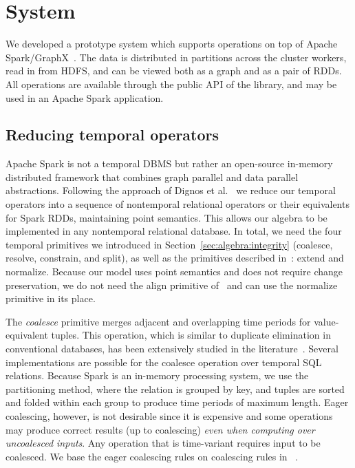 \section{System}
\label{sec:sys}

We developed a prototype system \ql which supports \tga operations on
top of Apache Spark/GraphX~\cite{DBLP:conf/osdi/GonzalezXDCFS14}.  The
data is distributed in partitions across the cluster workers, read in
from HDFS, and can be viewed both as a graph and as a pair of RDDs.
All \tg operations are available through the public API of the \ql
library, and may be used in an Apache Spark application.

\subsection{Reducing temporal operators}

Apache Spark is not a temporal DBMS but rather an open-source
in-memory distributed framework that combines graph parallel and data
parallel abstractions.  Following the approach of Dignos et
al.~\cite{Dignos2012} we reduce our temporal operators into a sequence
of nontemporal relational operators or their equivalents for Spark
RDDs, maintaining point semantics.  This allows our algebra to be
implemented in any nontemporal relational database.  In total, we need
the four temporal primitives we introduced in
Section~\ref{sec:algebra:integrity} (coalesce, resolve, constrain, and
split), as well as the primitives described in~\cite{Dignos2012}:
extend and normalize.  Because our model uses point semantics and does
not require change preservation, we do not need the align primitive
of~\cite{Dignos2012} and can use the normalize primitive in its place.

The {\em coalesce} primitive merges adjacent and overlapping time
periods for value-equivalent tuples.  This operation, which is similar
to duplicate elimination in conventional databases, has been
extensively studied in the
literature~\cite{DBLP:conf/vldb/BohlenSS96,DBLP:journals/sigmod/Zimanyi06}.
Several implementations are possible for the coalesce operation over
temporal SQL relations.  Because Spark is an in-memory processing
system, we use the partitioning method, where the relation is grouped
by key, and tuples are sorted and folded within each group to produce
time periods of maximum length.  Eager coalescing, however, is not
desirable since it is expensive and some operations may produce
correct results (up to coalescing) {\em even when computing over
  uncoalesced inputs}. Any operation that is time-variant
requires input to be coalesced.  We base the eager coalescing
rules on coalescing rules in \tra~\cite{DBLP:conf/vldb/BohlenSS96}.


